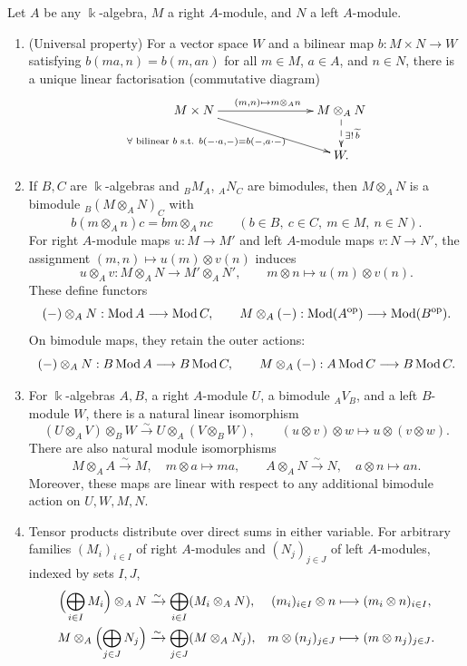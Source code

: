 \begin{lemma}\label{lem:tensor-properties}
Let $A$ be any $\Bbbk$-algebra, $M$ a right $A$-module, and $N$ a left $A$-module.
\begin{enumerate}
\item (Universal property) For a vector space $W$ and a bilinear map $b:M\times N\to W$ satisfying $b(ma,n)=b(m,an)$ for all $m\in M$, $a\in A$, and $n\in N$, there is a unique linear factorisation (commutative diagram)
\[
\xymatrix@C=75pt@R=22pt{
M\times N \ar[r]^{(m,n)\mapsto m\otimes_A n} \ar[dr]_{\forall \text{ bilinear }b \text{ s.t. } b(-\cdot a,-)=b(-,a\cdot-)\phantom{aaaaaaaaaa}}
& M\otimes_A N \ar@{-->}[d]^{\exists!\,\widetilde b}\\
& W.
}
\]

\item If $B,C$ are $\Bbbk$-algebras and ${}_BM_A$, ${}_AN_C$ are bimodules, then $M\otimes_A N$ is a bimodule ${}_B(M\otimes_A N)_C$ with
\[
b(m\otimes_A n)c=bm\otimes_A nc
\qquad(b\in B,\ c\in C,\ m\in M,\ n\in N).
\]
For right $A$-module maps $u:M\to M'$ and left $A$-module maps $v:N\to N'$, the assignment $(m,n)\mapsto u(m)\otimes v(n)$ induces
\[
u\otimes_A v:M\otimes_A N\longrightarrow M'\otimes_A N',
\qquad m\otimes n\longmapsto u(m)\otimes v(n).
\]
These define functors
\[
(-)\otimes_A N:\operatorname{\mathrm{Mod}} A\longrightarrow\operatorname{\mathrm{Mod}} C,\qquad
M\otimes_A(-):\operatorname{\mathrm{Mod}}(A^{\mathrm{op}})\longrightarrow\operatorname{\mathrm{Mod}}(B^{\mathrm{op}}).
\]
On bimodule maps, they retain the outer actions:
\[
(-)\otimes_A N: B\operatorname{\mathrm{Mod}} A \longrightarrow B\operatorname{\mathrm{Mod}} C,\qquad
M\otimes_A(-):A\operatorname{\mathrm{Mod}} C\longrightarrow B\operatorname{\mathrm{Mod}} C.
\]
\item For $\Bbbk$-algebras $A,B$, a right $A$-module $U$, a bimodule ${}_AV_B$, and a left $B$-module $W$, there is a natural linear isomorphism
\[
(U\otimes_A V)\otimes_B W\xrightarrow{\sim}U\otimes_A(V\otimes_B W),
\qquad (u\otimes v)\otimes w\longmapsto u\otimes(v\otimes w).
\]
There are also natural module isomorphisms
\[
M\otimes_A A\xrightarrow{\sim}M,\quad m\otimes a\longmapsto ma,
\qquad
A\otimes_A N\xrightarrow{\sim}N,\quad a\otimes n\longmapsto an.
\]
Moreover, these maps are linear with respect to any additional bimodule action on $U, W, M, N$.

\item Tensor products distribute over direct sums in either variable. For arbitrary families $(M_i)_{i\in I}$ of right $A$-modules and $(N_j)_{j\in J}$ of left $A$-modules, indexed by sets $I,J$,
\[
\begin{aligned}
\Bigl(\bigoplus_{i\in I}M_i\Bigr)\otimes_A N
&\xrightarrow{\sim}\bigoplus_{i\in I}(M_i\otimes_A N),
& (m_i)_{i\in I}\otimes n&\longmapsto(m_i\otimes n)_{i\in I},\\
M\otimes_A\Bigl(\bigoplus_{j\in J}N_j\Bigr)
&\xrightarrow{\sim}\bigoplus_{j\in J}(M\otimes_A N_j),
& m\otimes(n_j)_{j\in J}&\longmapsto(m\otimes n_j)_{j\in J}.
\end{aligned}
\]
\end{enumerate}
\end{lemma}

